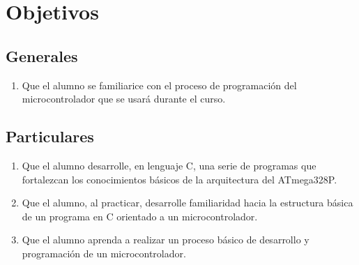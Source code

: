 \documentclass[10pt,letterpaper]{article}
\begin{document}

\section{Objetivos}
\subsection{Generales}
\begin{enumerate}[label=\arabic*)]
    \item Que el alumno se familiarice con el proceso de programación del microcontrolador que se usará durante el curso.
\end{enumerate}
\subsection{Particulares}
\begin{enumerate}
    \item Que el alumno desarrolle, en lenguaje C, una serie de programas que fortalezcan los conocimientos básicos de la arquitectura del ATmega328P.
    \item Que el alumno, al practicar, desarrolle familiaridad hacia la estructura básica de un programa en C orientado a un microcontrolador.
    \item Que el alumno aprenda a realizar un proceso básico de desarrollo y programación de un microcontrolador.
\end{enumerate}
\end{document}
